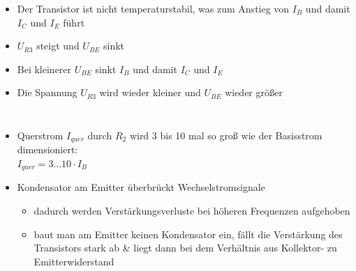 \begin{frame}
\begin{columns}
    \begin{itemize}
      \item Der Transistor ist nicht temperaturstabil, was zum Anstieg von $I_B$ und damit $I_C$ und $I_E$ führt
      \item $U_{R3}$ steigt und $U_{BE}$ sinkt
      \item Bei kleinerer $U_{BE}$ sinkt $I_B$ und damit $I_C$ und $I_E$
      \item Die Spannung $U_{R3}$ wird wieder kleiner und $U_{BE}$ wieder größer
    \end{itemize}
  \end{columns}
\end{frame}

\begin{frame}
  \begin{itemize}
    \item Querstrom $I_{quer}$ durch $R_2$ wird 3 bis 10 mal so groß wie der
      Basisstrom dimensioniert: \\

      $I_{quer} = 3 ... 10 \cdot I_B$

    \item Kondensator am Emitter überbrückt Wechselstromsignale
      \begin{itemize}
        \item dadurch werden Verstärkungsverluste bei höheren Frequenzen aufgehoben
        \item baut man am Emitter keinen Kondensator ein, fällt die Verstärkung des
          Transistors stark ab \& liegt dann bei dem Verhältnis aus Kollektor- zu
          Emitterwiderstand
      \end{itemize}
  \end{itemize}
\end{frame}

